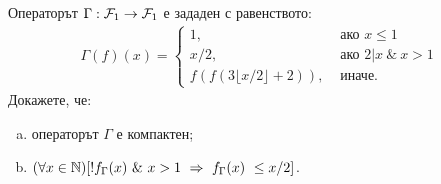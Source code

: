 \begin{problem}
  Операторът $\Gamma:\mathcal{F}_1 \to \mathcal{F}_1$ е зададен с равенството:
  \begin{align*}
    \Gamma(f)(x) = 
    \begin{cases}
      1, & \text{ ако } x \leq 1\\
      x/2, & \text{ ако } 2\vert x\ \&\ x > 1\\
      f(f(3\lfloor{x/2}\rfloor+2)), & \text{ иначе}.
    \end{cases}
  \end{align*}
  Докажете, че:
  \begin{enumerate}[a)]
  \item 
    операторът $\Gamma$ е компактен;
  \item
    $(\forall x\in\Nat)[!f_\Gamma(x)\ \&\ x > 1\ \Rightarrow\ f_\Gamma(x)\ \leq x/2]$.
  \end{enumerate}  
\end{problem}


